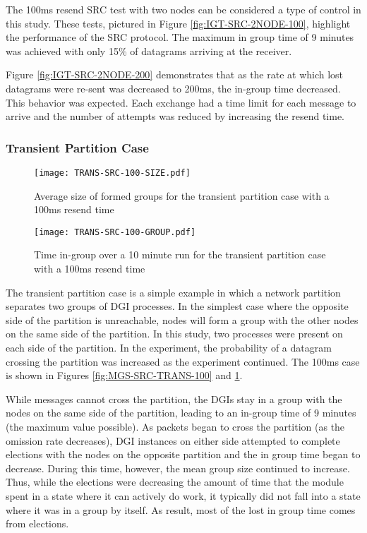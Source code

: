 The 100ms resend SRC test with two nodes can be considered a type of control in this study.
These tests, pictured in Figure \ref{fig:IGT-SRC-2NODE-100}, highlight the performance of the SRC protocol.
The maximum in group time of 9 minutes was achieved with only 15\% of datagrams arriving at the receiver. 

Figure \ref{fig:IGT-SRC-2NODE-200} demonstrates that as the rate at which lost datagrams were re-sent was decreased to 200ms, the in-group time decreased.
This behavior was expected.
Each exchange had a time limit for each message to arrive and the number of attempts was reduced by increasing the resend time.

\subsubsection{Transient Partition Case}

\begin{figure}
\centering
\begin{minipage}{0.45\textwidth}
    \centering
    \texttt{[image: TRANS-SRC-100-SIZE.pdf]}
    \caption{Average size of formed groups for the transient partition case with a 100ms resend time}
    \label{fig:MGS-SRC-TRANS-100}
\end{minipage}%
\qquad
\begin{minipage}{0.45\textwidth}
    \centering
    \texttt{[image: TRANS-SRC-100-GROUP.pdf]}
    \caption{Time in-group over a 10 minute run for the transient partition case with a 100ms resend time}
    \label{fig:IGT-SRC-TRANS-100}
\end{minipage}
\end{figure}

The transient partition case is a simple example in which a network partition separates two groups of DGI processes. In the simplest case where the opposite side of the partition is unreachable, nodes will form a group with the other nodes on the same side of the partition.
In this study, two processes were present on each side of the partition.
In the experiment, the probability of a datagram crossing the partition was increased as the experiment continued.
The 100ms case is shown in Figures \ref{fig:MGS-SRC-TRANS-100} and \ref{fig:IGT-SRC-TRANS-100}.

While messages cannot cross the partition, the DGIs stay in a group with the nodes on the same side of the partition, leading to an in-group time of 9 minutes (the maximum value possible).
As packets began to cross the partition (as the omission rate decreases), DGI instances on either side attempted to complete elections with the nodes on the opposite partition and the in group time began to decrease.
During this time, however, the mean group size continued to increase.
Thus, while the elections were decreasing the amount of time that the module spent in a state where it can actively do work, it typically did not fall into a state where it was in a group by itself. 
As result, most of the lost in group time comes from elections.

